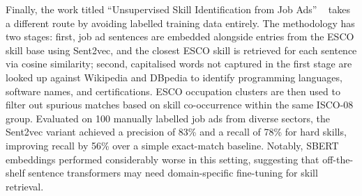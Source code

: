 \documentclass[]{ceurart}
\begin{document}
Finally, the work titled ``Unsupervised Skill Identification from Job Ads'' 
~\cite{Khaouja2021Unsupervised} takes a different route by avoiding
labelled training data entirely. The methodology has two stages: first, job ad
sentences are embedded alongside entries from the ESCO skill base using Sent2vec,
and the closest ESCO skill is retrieved for each sentence via cosine similarity;
second, capitalised words not captured in the first stage are looked up against
Wikipedia and DBpedia to identify programming languages, software names, and
certifications. ESCO occupation clusters are then used to filter out spurious
matches based on skill co-occurrence within the same ISCO-08 group. Evaluated on
100 manually labelled job ads from diverse sectors, the Sent2vec variant achieved
a precision of 83\% and a recall of 78\% for hard skills, improving recall by 56\%
over a simple exact-match baseline. Notably, SBERT embeddings performed
considerably worse in this setting, suggesting that off-the-shelf sentence
transformers may need domain-specific fine-tuning for skill retrieval. 
\end{document}
